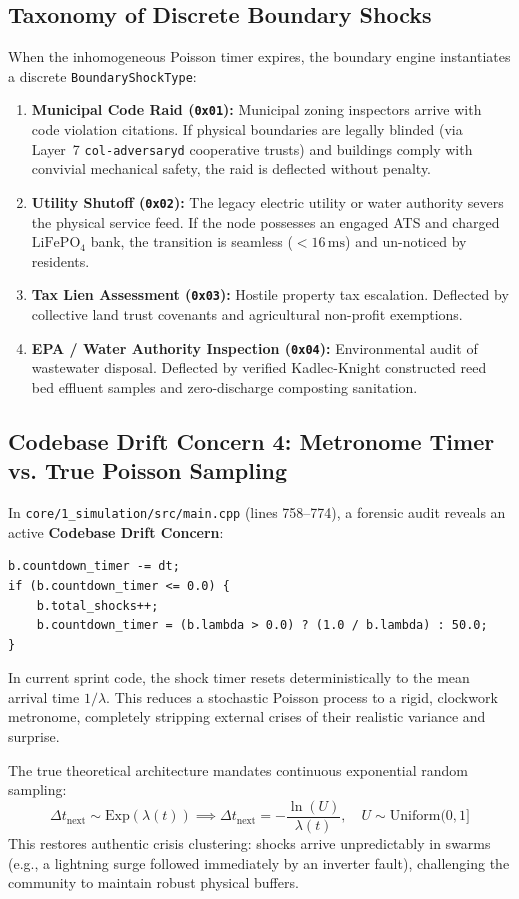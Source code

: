 \subsection{Taxonomy of Discrete Boundary Shocks}
When the inhomogeneous Poisson timer expires, the boundary engine instantiates a discrete \texttt{BoundaryShockType}:
\begin{enumerate}
    \item \textbf{Municipal Code Raid (\texttt{0x01}):} Municipal zoning inspectors arrive with code violation citations. If physical boundaries are legally blinded (via Layer~7 \texttt{col-adversaryd} cooperative trusts) and buildings comply with convivial mechanical safety, the raid is deflected without penalty.
    \item \textbf{Utility Shutoff (\texttt{0x02}):} The legacy electric utility or water authority severs the physical service feed. If the node possesses an engaged ATS and charged $\mathrm{LiFePO}_4$ bank, the transition is seamless ($<16\,\mathrm{ms}$) and un-noticed by residents.
    \item \textbf{Tax Lien Assessment (\texttt{0x03}):} Hostile property tax escalation. Deflected by collective land trust covenants and agricultural non-profit exemptions.
    \item \textbf{EPA / Water Authority Inspection (\texttt{0x04}):} Environmental audit of wastewater disposal. Deflected by verified Kadlec-Knight constructed reed bed effluent samples and zero-discharge composting sanitation.
\end{enumerate}

\subsection{Codebase Drift Concern 4: Metronome Timer vs. True Poisson Sampling}
In \texttt{core/1\_simulation/src/main.cpp} (lines 758--774), a forensic audit reveals an active \textbf{Codebase Drift Concern}:
\begin{verbatim}
b.countdown_timer -= dt;
if (b.countdown_timer <= 0.0) {
    b.total_shocks++;
    b.countdown_timer = (b.lambda > 0.0) ? (1.0 / b.lambda) : 50.0;
}
\end{verbatim}
In current sprint code, the shock timer resets deterministically to the mean arrival time $1 / \lambda$. This reduces a stochastic Poisson process to a rigid, clockwork metronome, completely stripping external crises of their realistic variance and surprise.

The true theoretical architecture mandates continuous exponential random sampling:
\begin{equation}
\Delta t_{\mathrm{next}} \sim \mathrm{Exp}(\lambda(t)) \implies \Delta t_{\mathrm{next}} = -\frac{\ln(U)}{\lambda(t)}, \quad U \sim \mathrm{Uniform}(0, 1]
\label{eq:exponential_sampling}
\end{equation}
This restores authentic crisis clustering: shocks arrive unpredictably in swarms (e.g., a lightning surge followed immediately by an inverter fault), challenging the community to maintain robust physical buffers.


